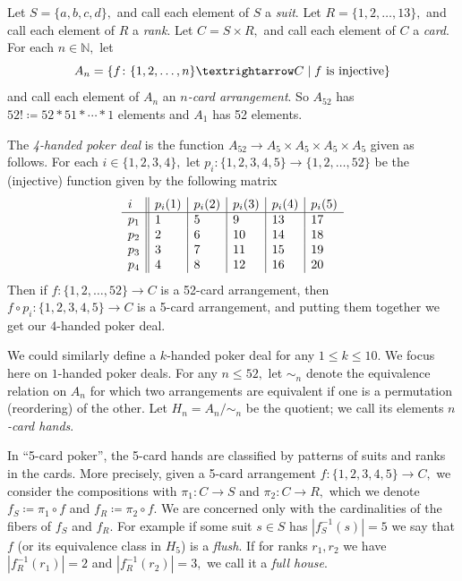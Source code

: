 \documentclass[../main/CT4S-EN-RU]{subfiles}
\begin{document}
\begin{exampleENG}
Let $S=\{a,b,c,d\},$ and call each element of $S$ a {\em suit}. Let $R=\{1,2,\ldots,13\},$ and call each element of $R$ a {\em rank}. Let $C=S\times R,$ and call each element of $C$ a {\em card}. For each $n\in{ℕ},$ let $$A_n=\{f\colon \{1,2,\ldots,n\}{→} C{\;|\;}f \tn{ is injective}\}$$ and call each element of $A_n$ an {\em $n$-card arrangement}. So $A_{52}$ has $52!{\coloneqq}52*51*\cdots*1$ elements and $A_1$ has 52 elements.

The {\em 4-handed poker deal} is the function $A_{52}{→} A_5\times A_5\times A_5\times A_5$ given as follows. For each $i\in\{1,2,3,4\},$ let $p_i\colon\{1,2,3,4,5\}{→}\{1,2,\ldots,52\}$ be the (injective) function given by the following matrix
\begin{align}
\begin{array}{l || l | l | l | l | l}
i&p_i(1)&p_i(2)&p_i(3)&p_i(4)&p_i(5)\\\hline
p_1&1&5&9&13&17\\
p_2&2&6&10&14&18\\
p_3&3&7&11&15&19\\
p_4&4&8&12&16&20
\end{array}
\end{align}
Then if $f\colon\{1,2,\ldots,52\}{→} C$ is a 52-card arrangement, then $f\circ p_i\colon\{1,2,3,4,5\}{→} C$ is a 5-card arrangement, and putting them together we get our 4-handed poker deal.

We could similarly define a $k$-handed poker deal for any $1\leq k\leq 10.$ We focus here on $1$-handed poker deals. For any $n\leq 52,$ let $\sim_n$ denote the equivalence relation on $A_n$ for which two arrangements are equivalent if one is a permutation (reordering) of the other. Let $H_n=A_n/\sim_n$ be the quotient; we call its elements {\em $n$-card hands}. 

In “5-card poker”, the 5-card hands are classified by patterns of suits and ranks in the cards. More precisely, given a 5-card arrangement $f\colon \{1,2,3,4,5\}{→} C,$ we consider the compositions with $\pi_1\colon C{→} S$ and $\pi_2\colon C{→} R,$ which we denote $f_S{\coloneqq}\pi_1\circ f$ and $f_R{\coloneqq}\pi_2\circ f.$ We are concerned only with the cardinalities of the fibers of $f_S$ and $f_R.$ For example if some suit $s\in S$ has $|f_S^{-1}(s)|=5$ we say that $f$ (or its equivalence class in $H_5$) is a {\em flush}. If for ranks $r_1,r_2$ we have $|f_R^{-1}(r_1)|=2$ and $|f_R^{-1}(r_2)|=3,$ we call it a {\em full house}. 
\end{exampleENG}
\end{document}
